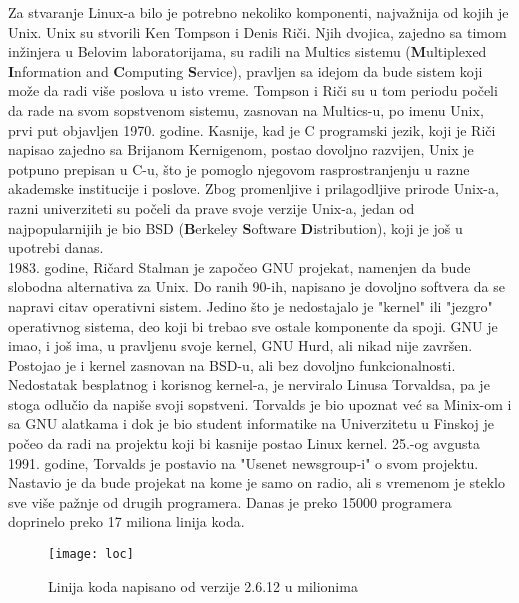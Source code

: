 Za stvaranje Linux-a bilo je potrebno nekoliko komponenti, najvažnija od kojih je Unix. Unix su stvorili Ken Tompson i Denis Riči. Njih dvojica, zajedno sa timom inžinjera u Belovim laboratorijama, su radili na Multics sistemu (\textbf{M}ultiplexed \textbf{I}nformation and \textbf{C}omputing \textbf{S}ervice), pravljen sa idejom da bude sistem koji može da radi više poslova u isto vreme. Tompson i Riči su u  tom periodu počeli da rade na svom sopstvenom sistemu, zasnovan na Multics-u, po imenu Unix, prvi put objavljen 1970. godine. Kasnije, kad je C programski jezik, koji je Riči napisao zajedno sa Brijanom Kernigenom, postao dovoljno razvijen, Unix je potpuno prepisan u C-u, što je pomoglo njegovom rasprostranjenju u razne akademske institucije i poslove. Zbog promenljive i prilagodljive prirode Unix-a, razni univerziteti su počeli da prave svoje verzije Unix-a, jedan od najpopularnijih je bio BSD (\textbf{B}erkeley \textbf{S}oftware \textbf{D}istribution), koji je još u upotrebi danas.\\

1983. godine, Ričard Stalman je započeo GNU projekat, namenjen da bude slobodna alternativa za Unix\cite{gnu}. Do ranih 90-ih, napisano je dovoljno softvera da se napravi citav operativni sistem. Jedino što je nedostajalo je "kernel" ili "jezgro" operativnog sistema, deo koji bi trebao sve ostale komponente da spoji. GNU je imao, i još ima, u pravljenu svoje kernel, GNU Hurd, ali nikad nije završen. Postojao je i kernel zasnovan na BSD-u, ali bez dovoljno funkcionalnosti.\\

Nedostatak besplatnog i korisnog kernel-a, je nerviralo Linusa Torvaldsa, pa je stoga odlučio da napiše svoji sopstveni. Torvalds je bio upoznat već sa Minix-om i sa GNU alatkama i dok je bio student informatike na Univerzitetu u Finskoj je počeo da radi na projektu koji bi kasnije postao Linux kernel. 25.-og avgusta 1991. godine, Torvalds je postavio na "Usenet newsgroup-i" o svom projektu. Nastavio je da bude projekat na kome je samo on radio, ali s vremenom je steklo sve više pažnje od drugih programera. Danas je preko 15000 programera \cite{linuxfoundation} doprinelo preko 17 miliona linija koda.\\
\begin{figure}[h]
\centering
\texttt{[image: loc]}
\caption{Linija koda napisano od verzije 2.6.12 u milionima}
\end{figure}
